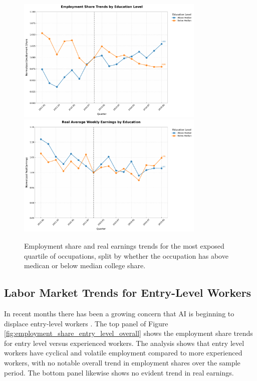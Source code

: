 \documentclass[12pt]{article}
\numberwithin{equation}{section}
\theoremstyle{theorem}\newcustomtheorem{theorem}{{\bf\sc Theorem}}
\theoremstyle{definition}\newcustomtheorem{assumption}{{\bf\sc Assumption}}
\theoremstyle{theorem} \newcustomtheorem{proposition}{{\bf\sc Proposition}}
\begin{document}
\begin{figure}[htbp]
	\centering
  \includegraphics[width=0.8\textwidth]{../figures/employment_share_change_by_education_2021q1.pdf}
  \includegraphics[width=0.8\textwidth]{../figures/real_earnings_change_by_education_2021q1.pdf}
	\caption{Employment share and real earnings trends for the most exposed quartile of occupations, split by whether the occupation has above medican or below median college share. }
	\label{fig:employment_share_change_by_education_2022q4}
\end{figure}


\subsection{Labor Market Trends for Entry-Level Workers}

In recent months there has been a growing concern that AI is beginning to displace entry-level workers \citep{thompson_something_2025,raman_opinion_2025,allen_behind_2025}. The top panel of Figure  \ref{fig:employment_share_entry_level_overall} shows the employment share trends for entry level versus experienced workers. The analysis shows that entry level workers have cyclical and volatile employment compared to more experienced workers, with no notable overall trend in employment shares over the sample period. The bottom panel likewise shows no evident trend in real earnings. 
\end{document}
